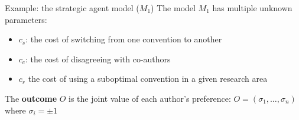 \documentclass[10pt]{beamer}
\begin{document}
\begin{frame}{Example: the strategic agent model ($M_1$)}
    The model $M_1$ has multiple unknown parameters:
    \begin{itemize}
        \item $c_s$: the cost of switching from one convention to another
        \item $c_c$: the cost of disagreeing with co-authors
        \item $c_{r}$ the cost of using a suboptimal convention in a given research area
    \end{itemize}

    \vspace{0.5em}

    The \textbf{outcome} $O$ is the joint value of each author's preference: $O=(\sigma_1,\dots,\sigma_n)$ where $\sigma_i = \pm 1$

\end{frame}
\end{document}
